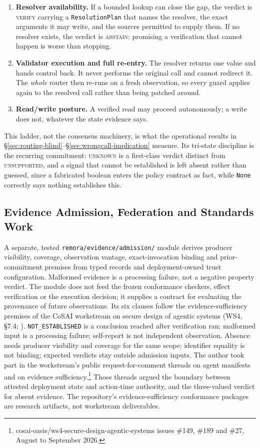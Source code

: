 \documentclass[10pt,twocolumn]{article}
\begin{document}
\begin{enumerate}
\item \textbf{Resolver availability.} If a bounded lookup can close the gap, the
  verdict is \textsc{verify} carrying a \texttt{ResolutionPlan} that names the
  resolver, the exact arguments it may write, and the sources permitted to
  supply them. If no resolver exists, the verdict is \textsc{abstain}:
  promising a verification that cannot happen is worse than stopping.
\item \textbf{Validator execution and full re-entry.} The resolver returns one
  value and hands control back. It never performs the original call and cannot
  redirect it. The \emph{whole} router then re-runs on a fresh observation, so
  every guard applies again to the resolved call rather than being patched
  around.
\item \textbf{Read/write posture.} A verified read may proceed autonomously; a
  write does not, whatever the state evidence says.
\end{enumerate}

This ladder, not the consensus machinery, is what the operational results in
\S\ref{sec:routing-blind}--\S\ref{sec:wrongcall-implication} measure. Its
tri-state discipline is the recurring commitment: \textsc{unknown} is a first-class
verdict distinct from \textsc{unsupported}, and a signal that cannot be established
is left absent rather than guessed, since a fabricated boolean enters the policy
contract as fact, while \texttt{None} correctly says nothing establishes this.

\subsection{Evidence Admission, Federation and Standards Work}
\label{sec:federation}

A separate, tested \texttt{remora/evidence/admission/} module derives
producer visibility, coverage, observation vantage, exact-invocation binding
and prior-commitment premises from typed records and deployment-owned trust
configuration. Malformed evidence is a processing failure, not a negative
property verdict. The module does not feed the frozen conformance checkers,
effect verification or the execution decision; it supplies a contract for
evaluating the provenance of future observations. Its six clauses follow
the evidence-sufficiency premises of the CoSAI workstream on secure design
of agentic systems (WS4, \S7.4; ).
\texttt{NOT\_ESTABLISHED} is a conclusion reached after verification ran;
malformed input is a processing failure; self-report is not independent
observation. Absence needs producer visibility and coverage for the same
scope; identifier equality is not binding; expected verdicts stay outside
admission inputs. The author took part in the workstream's public
request-for-comment threads on agent manifests and on evidence
sufficiency.\footnote{cosai-oasis/ws4-secure-design-agentic-systems
issues \#149, \#189 and \#27, August to September 2026.} Those threads
argued the boundary between attested deployment state and action-time
authority, and the three-valued verdict for absent evidence. The repository's
evidence-sufficiency conformance packages are research artifacts, not
workstream deliverables.
\end{document}
